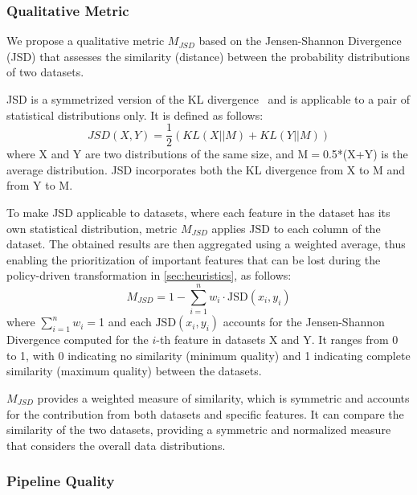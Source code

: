 \subsubsection{Qualitative Metric}
We propose a qualitative metric $M_{JSD}$ based on the Jensen-Shannon Divergence (JSD) that assesses the similarity (distance) between the probability distributions of two datasets.

JSD is a symmetrized version of the KL divergence~\cite{Fuglede} and is applicable to a pair of statistical distributions only. It is defined as follows:
\[JSD(X, Y) = \frac{1}{2} \left( KL(X || M)
  + KL(Y || M) \right)\]
%
where X and Y are two distributions of the same size, and M$=$0.5*(X+Y) is the average distribution.
JSD incorporates both the KL divergence from X to M and from Y to M.

To make JSD applicable to datasets, where each feature in the dataset has its own statistical distribution, metric $M_{JSD}$ applies JSD to each column of the dataset. The obtained results are then aggregated using a weighted average, thus enabling the prioritization of important features that can be lost during the policy-driven transformation in \cref{sec:heuristics}, as follows: \[M_{JSD} = 1 - \sum_{i=1}^n w_i \cdot \text{JSD}(x_i,y_i)\]
where $\sum_{i=1}^n w_i$$=$1 and each \(\text{JSD}(x_i,y_i)\) accounts for the Jensen-Shannon Divergence computed for the \(i\)-th feature in datasets X and Y. It ranges from 0 to 1, with 0 indicating no similarity (minimum quality) and 1 indicating complete similarity (maximum quality) between the datasets.

$M_{JSD}$ provides a weighted measure of similarity, which is symmetric and accounts for the contribution from both datasets and specific features. It can compare the similarity of the two datasets, providing a symmetric and normalized measure that considers the overall data distributions.


\subsubsection{Pipeline Quality}

